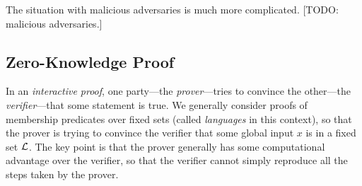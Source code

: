 The situation with malicious adversaries is much more complicated. [TODO:
malicious adversaries.]




\subsection{Zero-Knowledge Proof}

In an \emph{interactive proof}, one party---the \emph{prover}---tries to
convince the other---the \emph{verifier}---that some statement is true. We
generally consider proofs of membership predicates over fixed sets (called
\emph{languages} in this context), so that the prover is trying to convince the
verifier that some global input $x$ is in a fixed set $\mathcal{L}$. The key point is
that the prover generally has some computational advantage over the verifier, so
that the verifier cannot simply reproduce all the steps taken by the prover.

